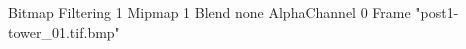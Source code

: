 {Bitmap
	{Filtering 1}
	{Mipmap 1}
	{Blend none}
	{AlphaChannel 0}
	{Frame "post1-tower_01.tif.bmp"}
}
